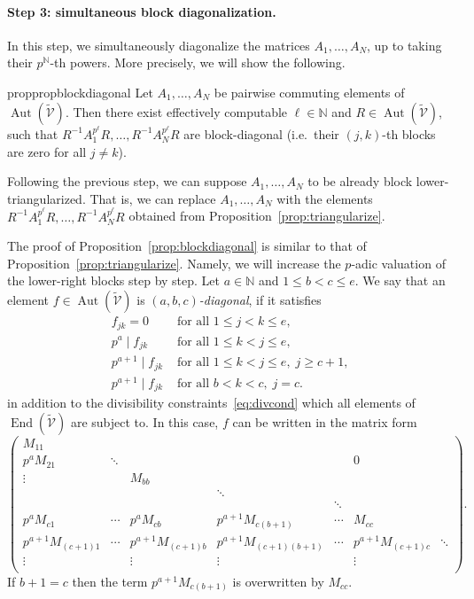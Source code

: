 \documentclass[letterpaper, 11pt, thm-restate]{article}
\numberwithin{equation}{section}
\newcommand{\N}{\mathbb{N}}
\newcommand{\Aut}{\operatorname{Aut}}
\newcommand{\End}{\operatorname{End}}
\newcommand{\tmV}{\widetilde{\mathcal{V}}}
\theoremstyle{definition}
\theoremstyle{definition}
\theoremstyle{definition}
\begin{document}
\paragraph{Step 3: simultaneous block diagonalization.} %

In this step, we simultaneously diagonalize the matrices $A_1, \ldots, A_N$, up to taking their $p^{\N}$-th powers.
More precisely, we will show the following.

\begin{restatable}{prop}{propblockdiagonal}\label{prop:blockdiagonal}
    Let $A_1, \ldots, A_N$ be pairwise commuting elements of $\Aut(\tmV)$.
    Then there exist effectively computable $\ell \in \N$ and $R \in \Aut(\tmV)$, such that $R^{-1}A_1^{p^{\ell}}R, \ldots, R^{-1}A_N^{p^{\ell}}R$ are block-diagonal (i.e.\ their $(j,k)$-th blocks are zero for all $j \neq k$).
\end{restatable}

Following the previous step, we can suppose $A_1, \ldots, A_N$ to be already block lower-triangularized.
That is, we can replace $A_1, \ldots, A_N$ with the elements $R^{-1}A_1^{p^{\ell}}R, \ldots, R^{-1}A_N^{p^{\ell}}R$ obtained from Proposition~\ref{prop:triangularize}.

The proof of Proposition~\ref{prop:blockdiagonal} is similar to that of Proposition~\ref{prop:triangularize}.
Namely, we will increase the $p$-adic valuation of the lower-right blocks step by step.
Let $a \in \N$ and $1 \leq b < c \leq e$. 
We say that an element $f \in \Aut(\tmV)$ is \emph{$(a,b,c)$-diagonal}, if it satisfies
\begin{align}\label{eq:abcdiagonal}
    f_{jk} = 0 & \text{ for all } 1 \leq j < k \leq e, \nonumber\\
    p^{a} \mid f_{jk} & \text{ for all } 1 \leq k < j \leq e, \nonumber\\
    p^{a+1} \mid f_{jk} & \text{ for all } 1 \leq k < j \leq e, \; j \geq c +1, \nonumber\\
    p^{a+1} \mid f_{jk} & \text{ for all } b < k < c, \; j = c.
\end{align}
in addition to the divisibility constraints~\eqref{eq:divcond} which all elements of $\End(\tmV)$ are subject to.
In this case, $f$ can be written in the matrix form
\[
    \begin{pmatrix}
        M_{11} & & & & & \\    
        p^a M_{21} & \ddots & & &&0 \\
        \vdots & & M_{bb} \\
         & & & \ddots & \\
        & & & & \ddots & \\
        p^a M_{c1} & \cdots & p^a M_{cb} & p^{a+1} M_{c(b+1)} & \cdots & M_{cc} \\
        p^{a+1} M_{(c+1)1} & \cdots & p^{a+1} M_{(c+1)b} & p^{a+1} M_{(c+1)(b+1)} & \cdots & p^{a+1} M_{(c+1)c} & \ddots \\
        \vdots & & \vdots & \vdots & & \vdots \\
    \end{pmatrix}.
\]
If $b+1 = c$ then the term $p^{a+1} M_{c(b+1)}$ is overwritten by $M_{cc}$.
\end{document}
